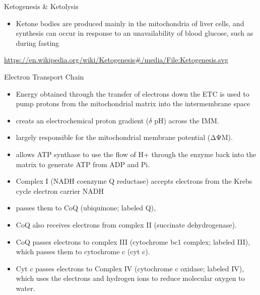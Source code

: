 \documentclass[presentation, smaller]{beamer}
\begin{document}
\begin{frame}[label={sec:org9953c48}]{Ketogenesis \& Ketolysis}
\begin{itemize}
\item Ketone bodies are produced mainly in the mitochondria of liver cells, and synthesis can occur in response to an unavailability of blood glucose, such as during fasting
\end{itemize}
\url{https://en.wikipedia.org/wiki/Ketogenesis\#/media/File:Ketogenesis.svg}
\end{frame}
\begin{frame}[label={sec:orgfa182fd}]{Electron Transport Chain}
\begin{itemize}
\item Energy obtained through the transfer of electrons down the ETC is used to pump protons from the mitochondrial matrix into the intermembrane space
\item creats an electrochemical proton gradient (\(\delta\) pH) across the IMM.
\item largely responsible for the mitochondrial membrane potential (ΔΨM).
\item allows ATP synthase to use the flow of H+ through the enzyme back into the matrix to generate ATP from ADP and Pi.
\item Complex I (NADH coenzyme Q reductase) accepts electrons from the Krebs cycle electron carrier NADH
\item passes them to CoQ (ubiquinone; labeled Q),
\item CoQ also receives electrons from complex II (succinate dehydrogenase).
\item CoQ passes electrons to complex III (cytochrome bc1 complex; labeled III), which passes them to cytochrome c (cyt c).
\item Cyt c passes electrons to Complex IV (cytochrome c oxidase; labeled IV), which uses the electrons and hydrogen ions to reduce molecular oxygen to water.
\end{itemize}
\end{frame}
\end{document}
